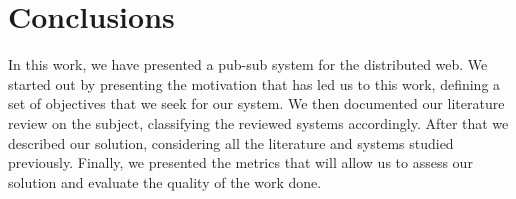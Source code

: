 
%
%

\section{Conclusions}

In this work, we have presented a pub-sub system for the distributed web.
We started out by presenting the motivation that has led us to this work,
defining a set of objectives that we seek for our system. We then documented our
literature review on the subject, classifying the reviewed systems accordingly.
After that we described our solution, considering all the literature and systems
studied previously. Finally, we presented the metrics that will allow us to
assess our solution and evaluate the quality of the work done.
